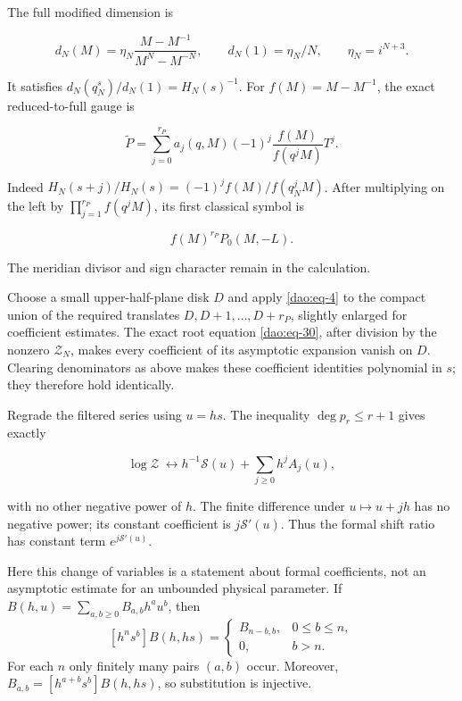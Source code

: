 The full modified dimension is

\begin{equation}\label{dao:eq-29}
d_N(M)=\eta_N\frac{M-M^{-1}}{M^N-M^{-N}},\qquad
 d_N(1)=\eta_N/N,\qquad \eta_N=i^{N+3}.
\end{equation}

It satisfies \(d_N(q_N^s)/d_N(1)=H_N(s)^{-1}\). For \(f(M)=M-M^{-1}\), the exact reduced-to-full gauge is

\begin{equation}\label{dao:eq-30}
\widetilde P=\sum_{j=0}^{r_P}
 a_j(q,M)(-1)^j\frac{f(M)}{f(q^jM)}T^j.
\end{equation}

Indeed \(H_N(s+j)/H_N(s)=(-1)^j f(M)/f(q_N^jM)\). After multiplying on the left by \(\prod_{j=1}^{r_P}f(q^jM)\), its first classical symbol is

\begin{equation}\label{dao:eq-31}
f(M)^{r_P}P_0(M,-L).
\end{equation}

The meridian divisor and sign character remain in the calculation.

Choose a small upper-half-plane disk \(D\) and apply \eqref{dao:eq-4} to the compact union of the required translates \(D,D+1,\ldots,D+r_P\), slightly enlarged for coefficient estimates. The exact root equation \eqref{dao:eq-30}, after division by the nonzero \(\mathcal Z_N\), makes every coefficient of its asymptotic expansion vanish on \(D\). Clearing denominators as above makes these coefficient identities polynomial in \(s\); they therefore hold identically.

Regrade the filtered series using \(u=hs\). The inequality \(\deg p_r\le r+1\) gives exactly

\begin{equation}\label{dao:eq-32}
\log\mathcal Z\ \longleftrightarrow
 h^{-1}\mathcal S(u)+\sum_{j\ge0}h^j A_j(u),
\end{equation}

with no other negative power of \(h\). The finite difference under \(u\mapsto u+jh\) has no negative power; its constant coefficient is \(j\mathcal S'(u)\). Thus the formal shift ratio has constant term \(e^{j\mathcal S'(u)}\).

Here this change of variables is a statement about formal coefficients,
not an asymptotic estimate for an unbounded physical parameter. If
\(B(h,u)=\sum_{a,b\ge0}B_{a,b}h^au^b\), then
\[
 [h^ns^b]B(h,hs)=
 \begin{cases}
 B_{n-b,b},&0\le b\le n,\\
 0,&b>n.
 \end{cases}
\]
For each \(n\) only finitely many pairs \((a,b)\) occur. Moreover,
\(B_{a,b}=[h^{a+b}s^b]B(h,hs)\), so substitution is injective.

